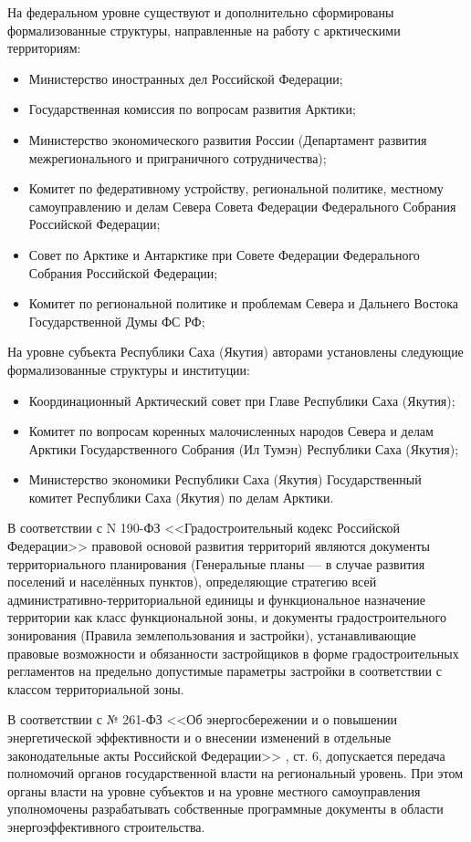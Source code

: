 На федеральном уровне существуют и дополнительно сформированы формализованные структуры, направленные на работу с арктическими территориям:
\begin{itemize}
    \item Министерство иностранных дел Российской Федерации;
    \item Государственная комиссия по вопросам развития Арктики;
    \item Министерство экономического развития России (Департамент развития межрегионального и приграничного сотрудничества);
    \item Комитет по федеративному устройству, региональной политике, местному самоуправлению и делам Севера Совета Федерации Федерального Собрания Российской Федерации;
    \item Совет по Арктике и Антарктике при Совете Федерации Федерального Собрания Российской Федерации;
    \item Комитет по региональной политике и проблемам Севера и Дальнего Востока Государственной Думы ФС РФ;
\end{itemize}
На уровне субъекта Республики Саха (Якутия) авторами установлены следующие формализованные структуры и институции:
\begin{itemize}
    \item Координационный Арктический совет при Главе Республики Саха (Якутия);
    \item Комитет по вопросам коренных малочисленных народов Севера и делам Арктики Государственного Собрания (Ил Тумэн) Республики Саха (Якутия);
    \item Министерство экономики Республики Саха (Якутия) Государственный комитет Республики Саха (Якутия) по делам Арктики.
\end{itemize}
В соответствии с N 190-ФЗ <<Градостроительный кодекс Российской Федерации>> \cite{law_RU_GradoCodex} правовой основой развития территорий являются
документы территориального планирования (Генеральные планы — в случае развития поселений и населённых пунктов),
определяющие стратегию всей административно-территориальной единицы и функциональное назначение территории как класс функциональной зоны,
и документы градостроительного зонирования (Правила землепользования и застройки), устанавливающие правовые возможности и обязанности застройщиков
в форме градостроительных регламентов на предельно допустимые параметры застройки в соответствии с классом территориальной зоны.

В соответствии с № 261-ФЗ <<Об энергосбережении и о повышении энергетической эффективности и о внесении изменений в отдельные законодательные акты Российской Федерации>>
\cite{law_RU_fz_EnergyEff}, ст. 6, допускается передача полномочий органов государственной власти на региональный уровень. При этом органы власти на уровне субъектов и на уровне местного
самоуправления уполномочены разрабатывать собственные программные документы в области энергоэффективного строительства.

